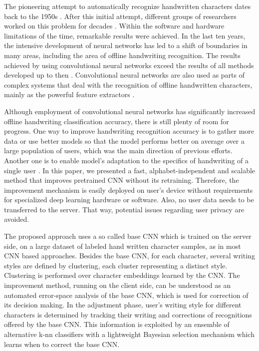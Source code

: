 \documentclass{article}
\begin{document}
The pioneering attempt to automatically recognize handwritten characters dates back to the 1950s \citep{leedham}.
After this initial attempt, different groups of researchers worked on this problem for decades \citep{plamondon}.
Within the software and hardware limitations of the time, remarkable results were achieved.
In the last ten years, the intensive development of neural networks has led to a shift of boundaries in many areas,
including the area of offline handwriting recognition.
The results achieved by using convolutional neural networks exceed the results of all methods developed up to then \citep{cnnbest1,cnnbest2,cnnbest3}.
Convolutional neural networks are also used as parts of complex systems that deal with the recognition of offline handwritten characters,
mainly as the powerful feature extractors \citep{cnnrelated1,cnnrelated2,cnnrelated3}.

Although employment of convolutional neural networks has significantly increased offline handwriting classification accuracy, there is still plenty of room for progress. One way to improve handwriting recognition accuracy is to gather more data or use better models so that the model performs better on average over a large population of users, which was the main direction of previous efforts. Another one is to enable model's adaptation to the specifics of handwriting of a single user
\cite{}.
In this paper, we presented a fast, alphabet-independent and scalable method that improves pretrained CNN without its retraining. Therefore, the improvement mechanism is easily deployed on user's device without requirements for specialized deep learning hardware or software. Also, no user data needs to be
transferred to the server. That way, potential issues regarding user privacy are avoided.
  
The proposed approach uses a so called base CNN which is trained on the server side, on a large dataset of labeled hand written character samples, as in most CNN based approaches. Besides the base CNN, for each character, several writing styles are defined by clustering, each cluster representing a distinct style. Clustering is performed over character embeddings learned by the CNN. The improvement method, running on the client side, can be understood as an automated error-space analysis of the base CNN, which is used for correction of its decision making. In the adjustment phase, user's writing style for different characters is determined by tracking their writing and corrections of recognitions offered by the base CNN. This information is exploited by an ensemble of alternative k-nn classifiers with a lightweight Bayesian selection mechanism which learns when to correct the base CNN.
\end{document}
